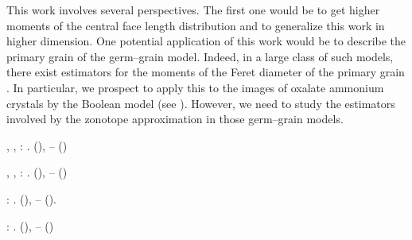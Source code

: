 \documentclass[numbers,compress,v1.0.1]{vmsta}
\theoremstyle{definition}
\begin{document}
This work involves several perspectives. The first one would be to get
higher moments of the central face length distribution and to
generalize this work in higher dimension. One potential application of
this work would be to describe the primary grain of the germ--grain
model. Indeed, in a large class of such models, there exist estimators
for the moments of the Feret diameter of the primary grain \cite{GSI}.
In particular, we prospect to apply this to the images of oxalate
ammonium crystals  by the Boolean model (see \citep
{GSI,ICSIA}). However, we need to study the estimators involved by the
zonotope approximation in those germ--grain models.

%

\begin{thebibliography}{32}

%
\begin{barticle}
,
,
:
.
(),
--
()
\end{barticle}
%
%
\OrigBibText
%
\begin{barticle}
,
,
:
.
(),
--
()
\end{barticle}
%
\endOrigBibText
{}%
\endbibitem

%
\begin{barticle}
:
.
(),
--
().
\end{barticle}
%
%
\OrigBibText
%
\begin{barticle}
:
.
(),
--
()
\end{barticle}
%
\endOrigBibText
{}%
\endbibitem


\end{thebibliography}
\end{document}
